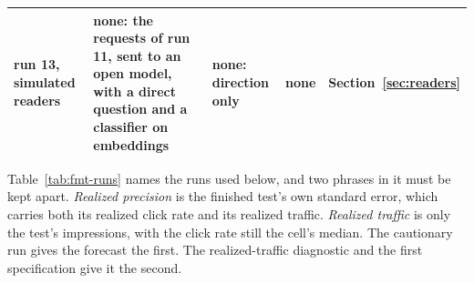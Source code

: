 \documentclass[sigconf,nonacm]{acmart}
\begin{document}
\begin{table}[t]
\begin{tabular}{p{}p{}p{}p{}p{}}
run 13, simulated readers & none: the requests of run 11, sent to an open model, with a direct question and a classifier on embeddings & none: direction only & none & Section~\ref{sec:readers} \\
\bottomrule
\end{tabular}
\end{table}

Table~\ref{tab:fmt-runs} names the runs used below, and two phrases in it must be kept apart. \emph{Realized precision} is the finished test's own standard error, which carries both its realized click rate and its realized traffic. \emph{Realized traffic} is only the test's impressions, with the click rate still the cell's median. The cautionary run gives the forecast the first. The realized-traffic diagnostic and the first specification give it the second.
\end{document}
